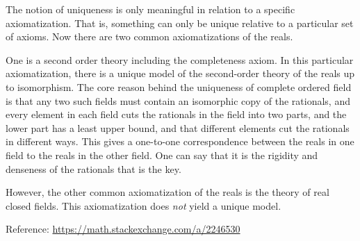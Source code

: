 \documentclass[11pt,twoside=off,numbers=noenddot]{scrbook}
\begin{document}
\begin{remark}
    The notion of uniqueness is only meaningful in relation to a specific axiomatization. That is, something can only be unique relative to a particular set of axioms. Now there are two common axiomatizations of the reals.

    One is a second order theory including the completeness axiom. In this particular axiomatization, there is a unique model of the second-order theory of the reals up to isomorphism. The core reason behind the uniqueness of complete ordered field is that any two such fields must contain an isomorphic copy of the rationals, and every element in each field cuts the rationals in the field into two parts, and the lower part has a least upper bound, and that different elements cut the rationals in different ways. This gives a one-to-one correspondence between the reals in one field to the reals in the other field. One can say that it is the rigidity and denseness of the rationals that is the key.

    However, the other common axiomatization of the reals is the theory of real closed fields. This axiomatization does \textit{not} yield a unique model.

    Reference: \url{https://math.stackexchange.com/a/2246530}
\end{remark}
\end{document}
